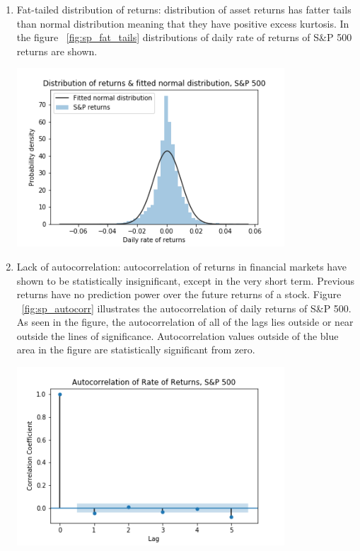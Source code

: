 \begin{enumerate}
    \item Fat-tailed distribution of returns: distribution of asset returns has fatter tails than normal distribution meaning that they have positive excess kurtosis. 
          In the figure  ~\ref{fig:sp_fat_tails} distributions of daily rate of returns of S\&P 500 returns are shown.
    \par
    \begin{minipage}{\linewidth}
        \centering
        \includegraphics[width=10cm]{plots/S&P500_fat_tails.png}
        \label{fig:sp_fat_tails}
    \end{minipage}
    \item Lack of autocorrelation: autocorrelation of returns in financial markets have shown to be statistically insignificant, except in the very short term. 
          Previous returns have no prediction power over the future returns of a stock. 
          Figure ~\ref{fig:sp_autocorr} illustrates the autocorrelation of daily returns of S\&P 500.
          As seen in the figure, the autocorrelation of all of the lags lies outside or near outside the lines of significance.
          Autocorrelation values outside of the blue area in the figure are statistically significant from zero.
    \par
    \begin{minipage}{\linewidth}
        \centering
        \includegraphics[width=10cm]{plots/S&P500_autocorr.png}

\end{minipage}
\end{enumerate}
